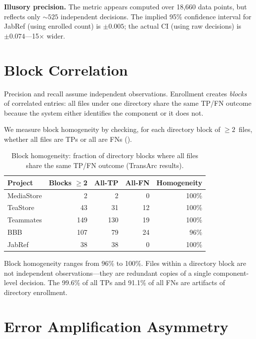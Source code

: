 \documentclass[11pt,a4paper]{report}
\newcommand{\transarc}{TransArc\xspace}
\begin{document}
\textbf{Illusory precision.} The metric appears computed over 18,660 data
points, but reflects only ${\sim}525$ independent decisions. The implied 95\%
confidence interval for JabRef (using enrolled count) is ${\pm}0.005$; the
actual CI (using raw decisions) is ${\pm}0.074$---15$\times$ wider.


\section{Block Correlation}
\label{sec:ineq:block}

Precision and recall assume independent observations. Enrollment creates
\emph{blocks} of correlated entries: all files under one directory share the
same TP/FN outcome because the system either identifies the component or it
does not.

We measure block homogeneity by checking, for each directory block of
${\geq}2$~files, whether all files are TPs or all are FNs
().

\begin{table}[h]
\caption{Block homogeneity: fraction of directory blocks where all files share
the same TP/FN outcome (\transarc results).}
\label{tab:homogeneity}
\centering\small
\begin{tabular}{lrrrr}
\toprule
\textbf{Project} & \textbf{Blocks $\geq$2} & \textbf{All-TP} & \textbf{All-FN} & \textbf{Homogeneity} \\
\midrule
MediaStore  & 2   & 2   & 0  & 100\% \\
TeaStore    & 43  & 31  & 12 & 100\% \\
Teammates   & 149 & 130 & 19 & 100\% \\
BBB         & 107 & 79  & 24 & 96\%  \\
JabRef      & 38  & 38  & 0  & 100\% \\
\bottomrule
\end{tabular}
\end{table}

Block homogeneity ranges from 96\% to 100\%. Files within a directory block
are not independent observations---they are redundant copies of a single
component-level decision. The 99.6\% of all TPs and 91.1\% of all FNs are
artifacts of directory enrollment.


\section{Error Amplification Asymmetry}
\label{sec:ineq:amplification}
\end{document}
